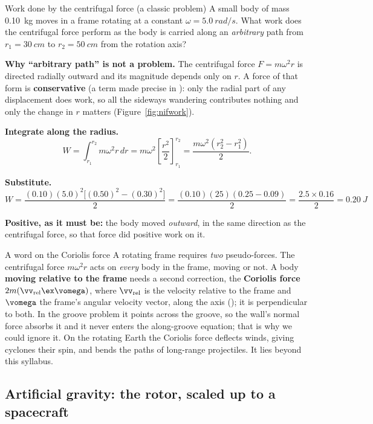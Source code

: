 \begin{exbox}{Work done by the centrifugal force \textnormal{(a classic problem)}}
A small body of mass \SI{0.10}{kg} moves in a frame rotating at a constant
$\omega=\SI{5.0}{rad/s}$. What work does the centrifugal force perform as the body is carried along an
\emph{arbitrary} path from $r_1=\SI{30}{cm}$ to $r_2=\SI{50}{cm}$ from the rotation axis?

 \textbf{Why ``arbitrary path'' is not a problem.} The centrifugal force $F=m\omega^{2}r$ is
directed radially outward and its magnitude depends only on $r$. A force of that form is
\textbf{conservative} (a term made precise in ): only the radial part of any
displacement does work, so all the sideways
wandering contributes nothing and only the change in $r$ matters (Figure~\ref{fig:nifwork}).

 \textbf{Integrate along the radius.}
\[
W=\int_{r_1}^{r_2} m\omega^{2}r\,dr
= m\omega^{2}\left[\frac{r^{2}}{2}\right]_{r_1}^{r_2}
=\frac{m\omega^{2}\left(r_2^{2}-r_1^{2}\right)}{2}.
\]

 \textbf{Substitute.}
\[
W=\frac{(0.10)(5.0)^{2}\big[(0.50)^{2}-(0.30)^{2}\big]}{2}
=\frac{(0.10)(25)(0.25-0.09)}{2}
=\frac{2.5\times0.16}{2}=\boxed{\SI{0.20}{J}}
\]

\smallskip
\textbf{Positive, as it must be:} the body moved \emph{outward}, in the same direction as the
centrifugal force, so that force did positive work on it.
\end{exbox}

\begin{remarkbox}{A word on the Coriolis force}
A rotating frame requires \emph{two} pseudo-forces. The centrifugal force $m\omega^{2}r$ acts on
\emph{every} body in the frame, moving or not. A body \textbf{moving relative to the frame} needs a
second correction, the \textbf{Coriolis force} $2m(\vv_{\text{rel}}\ex\vomega)$, where $\vv_{\text{rel}}$ is the
velocity relative to the frame and $\vomega$ the frame's angular velocity vector, along the axis
(); it is perpendicular to both. In the groove problem it points across the groove, so the wall's normal force
absorbs it and it never enters the along-groove equation; that is why we could ignore it. On the
rotating Earth the Coriolis force deflects winds, giving cyclones their spin, and bends the paths of
long-range projectiles. It lies beyond this syllabus.
\end{remarkbox}

\subsection{Artificial gravity: the rotor, scaled up to a spacecraft}

